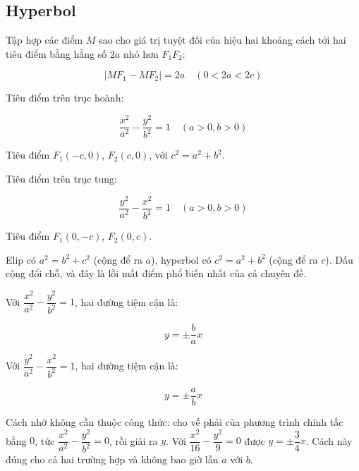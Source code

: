\documentclass[11pt, a4paper]{article}
\begin{document}
\subsection{Hyperbol}

\begin{dinhnghia}[{2 — Hyperbol}]
Tập hợp các điểm $M$ sao cho giá trị tuyệt đối của hiệu hai khoảng cách tới hai tiêu điểm bằng hằng số $2a$ nhỏ hơn $F_1F_2$:

$$|MF_1 - MF_2| = 2a \quad (0 < 2a < 2c)$$
\end{dinhnghia}
\begin{dinhly}
Tiêu điểm trên trục hoành:

$$\frac{x^2}{a^2} - \frac{y^2}{b^2} = 1 \quad (a > 0, b > 0)$$

Tiêu điểm $F_1(-c, 0)$, $F_2(c, 0)$, với $c^2 = a^2 + b^2$.

Tiêu điểm trên trục tung:

$$\frac{y^2}{a^2} - \frac{x^2}{b^2} = 1 \quad (a > 0, b > 0)$$

Tiêu điểm $F_1(0, -c)$, $F_2(0, c)$.

 Elip có $a^2 = b^2 + c^2$ (cộng để ra $a$), hyperbol có $c^2 = a^2 + b^2$ (cộng để ra $c$). Dấu cộng đổi chỗ, và đây là lỗi mất điểm phổ biến nhất của cả chuyên đề.
\end{dinhly}
\begin{dinhly}
Với $\dfrac{x^2}{a^2} - \dfrac{y^2}{b^2} = 1$, hai đường tiệm cận là:

$$y = \pm\frac{b}{a}x$$

Với $\dfrac{y^2}{a^2} - \dfrac{x^2}{b^2} = 1$, hai đường tiệm cận là:

$$y = \pm\frac{a}{b}x$$

 Cách nhớ không cần thuộc công thức: cho vế phải của phương trình chính tắc bằng $0$, tức $\dfrac{x^2}{a^2} - \dfrac{y^2}{b^2} = 0$, rồi giải ra $y$. Với $\dfrac{x^2}{16} - \dfrac{y^2}{9} = 0$ được $y = \pm\dfrac{3}{4}x$. Cách này đúng cho cả hai trường hợp và không bao giờ lẫn $a$ với $b$.
\end{dinhly}
\end{document}
